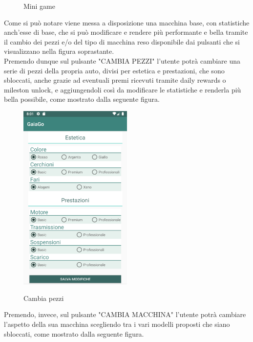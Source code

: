 \begin{itemize}
\begin{figure}[H]
	 	\caption{Mini game}
	 	\label{minigame}
	 \end{figure}
	 \pagebreak
	 Come si può notare viene messa a disposizione una macchina base, con statistiche anch'esse di base, che si può modificare e rendere più performante e bella tramite il cambio dei pezzi e/o del tipo di macchina reso disponibile dai pulsanti che si visualizzano nella figura soprastante.\\
	 Premendo dunque sul pulsante "CAMBIA PEZZI" l'utente potrà cambiare una serie di pezzi della propria auto, divisi per estetica e prestazioni, che sono sbloccati, anche grazie ad eventuali premi ricevuti tramite daily rewards o mileston unlock, e aggiungendoli così da modificare le statistiche e renderla più bella possibile, come mostrato dalla seguente figura.
	 \begin{figure}[H] 
	 	\centering 
	 	\includegraphics[width=0.5\textwidth]{res/images/minigame2.png}\\
	 	\caption{Cambia pezzi}
	 	\label{minigame2}
	 \end{figure}
	 \pagebreak
	 Premendo, invece, sul pulsante "CAMBIA MACCHINA" l'utente potrà cambiare l'aspetto della sua macchina scegliendo tra i vari modelli proposti che siano sbloccati, come mostrato dalla seguente figura.
	 \begin{figure}[H] 
	 	\centering 

\end{figure}
\end{itemize}
